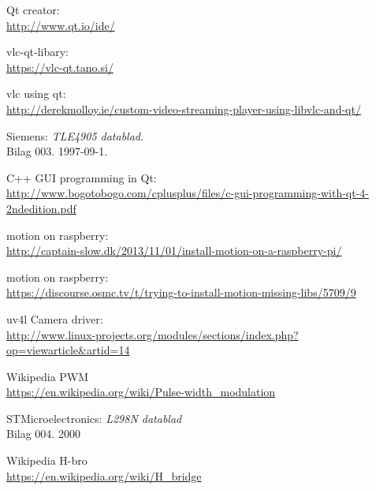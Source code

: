 \begin{thebibliography}{2}
 Qt creator: \\
\url{http://www.qt.io/ide/}

 vlc-qt-libary: \\
\url{https://vlc-qt.tano.si/}

 vlc using qt: \\
\url{http://derekmolloy.ie/custom-video-streaming-player-using-libvlc-and-qt/}

 Siemens: \textit{TLE4905 datablad}. \\
Bilag 003. 1997-09-1.

 C++ GUI programming in Qt: \\
\url{http://www.bogotobogo.com/cplusplus/files/c-gui-programming-with-qt-4-2ndedition.pdf}

 motion on raspberry: \\
\url{http://captain-slow.dk/2013/11/01/install-motion-on-a-raspberry-pi/}

 motion on raspberry: \\
\url{https://discourse.osmc.tv/t/trying-to-install-motion-missing-libs/5709/9}

 uv4l Camera driver: \\
\url{http://www.linux-projects.org/modules/sections/index.php?op=viewarticle&artid=14}

 Wikipedia PWM \\
\url{https://en.wikipedia.org/wiki/Pulse-width_modulation}


 STMicroelectronics: \textit{L298N datablad} \\
Bilag 004. 2000


 Wikipedia H-bro \\
\url{https://en.wikipedia.org/wiki/H_bridge}

\end{thebibliography}